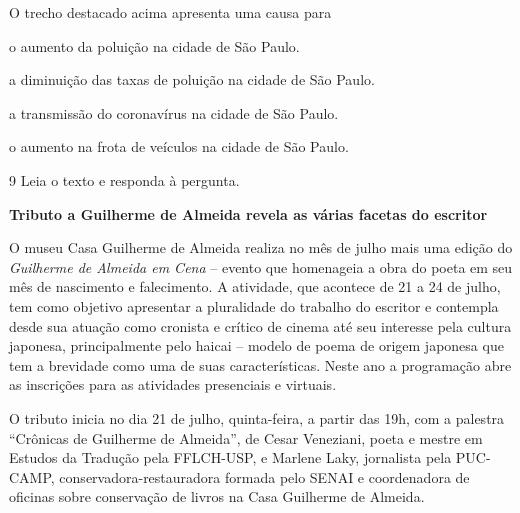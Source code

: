 \begin{myquote}
\begin{myescolha}
\begin{myquote}
\end{myquote}

O trecho destacado acima apresenta uma causa para

\begin{escolha}
  \item o aumento da poluição na cidade de São Paulo.

  \item a diminuição das taxas de poluição na cidade de São Paulo.

  \item a transmissão do coronavírus na cidade de São Paulo.

  \item o aumento na frota de veículos na cidade de São Paulo.
\end{escolha}

\num{9} Leia o texto e responda à pergunta.

\begin{myquote}
\textbf{Tributo a Guilherme de Almeida revela as várias facetas do 
escritor}

O museu Casa Guilherme de Almeida realiza no mês de julho mais uma
edição do \textit{Guilherme de Almeida em Cena} -- evento que homenageia a obra
do poeta em seu mês de nascimento e falecimento. A atividade, que
acontece de 21 a 24 de julho, tem como objetivo apresentar a pluralidade
do trabalho do escritor e contempla desde sua atuação como cronista e
crítico de cinema até seu interesse pela cultura japonesa,
principalmente pelo haicai -- modelo de poema de origem japonesa que tem
a brevidade como uma de suas características. Neste ano a programação
abre as inscrições para as atividades presenciais e virtuais.

O tributo inicia no dia 21 de julho, quinta-feira, a partir das 19h, com
a palestra ``Crônicas de Guilherme de Almeida'', de Cesar Veneziani,
poeta e mestre em Estudos da Tradução pela FFLCH-USP, e Marlene Laky,
jornalista pela PUC-CAMP, conservadora-restauradora formada pelo SENAI e
coordenadora de oficinas sobre conservação de livros na Casa Guilherme
de Almeida.

\end{myquote}


\end{myescolha}
\end{myquote}
